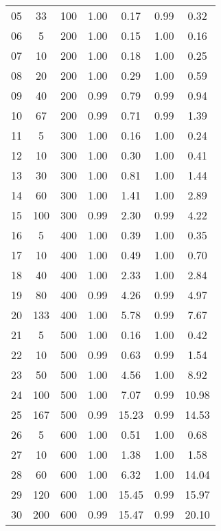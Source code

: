 \documentclass[11pt]{article}
\begin{document}
\begin{table}[]
\begin{tabular}{ccccccc}
			\rowcolor[HTML]{EFEFEF} 
			05 & 33 & 100 & 1.00 & 0.17 & 0.99 & 0.32 \\
			06 & 5 & 200 & 1.00 & 0.15 & 1.00 & 0.16 \\
			07 & 10 & 200 & 1.00 & 0.18 & 1.00 & 0.25 \\
			08 & 20 & 200 & 1.00 & 0.29 & 1.00 & 0.59 \\
			09 & 40 & 200 & 0.99 & 0.79 & 0.99 & 0.94 \\
			10 & 67 & 200 & 0.99 & 0.71 & 0.99 & 1.39 \\
			\rowcolor[HTML]{EFEFEF} 
			11 & 5 & 300 & 1.00 & 0.16 & 1.00 & 0.24 \\
			\rowcolor[HTML]{EFEFEF} 
			12 & 10 & 300 & 1.00 & 0.30 & 1.00 & 0.41 \\
			\rowcolor[HTML]{EFEFEF} 
			13 & 30 & 300 & 1.00 & 0.81 & 1.00 & 1.44 \\
			\rowcolor[HTML]{EFEFEF} 
			14 & 60 & 300 & 1.00 & 1.41 & 1.00 & 2.89 \\
			\rowcolor[HTML]{EFEFEF} 
			15 & 100 & 300 & 0.99 & 2.30 & 0.99 & 4.22 \\
			16 & 5 & 400 & 1.00 & 0.39 & 1.00 & 0.35 \\
			17 & 10 & 400 & 1.00 & 0.49 & 1.00 & 0.70 \\
			18 & 40 & 400 & 1.00 & 2.33 & 1.00 & 2.84 \\
			19 & 80 & 400 & 0.99 & 4.26 & 0.99 & 4.97 \\
			20 & 133 & 400 & 1.00 & 5.78 & 0.99 & 7.67 \\
			\rowcolor[HTML]{EFEFEF} 
			21 & 5 & 500 & 1.00 & 0.16 & 1.00 & 0.42 \\
			\rowcolor[HTML]{EFEFEF} 
			22 & 10 & 500 & 0.99 & 0.63 & 0.99 & 1.54 \\
			\rowcolor[HTML]{EFEFEF} 
			23 & 50 & 500 & 1.00 & 4.56 & 1.00 & 8.92 \\
			\rowcolor[HTML]{EFEFEF} 
			24 & 100 & 500 & 1.00 & 7.07 & 0.99 & 10.98 \\
			\rowcolor[HTML]{EFEFEF} 
			25 & 167 & 500 & 0.99 & 15.23 & 0.99 & 14.53 \\
			26 & 5 & 600 & 1.00 & 0.51 & 1.00 & 0.68 \\
			27 & 10 & 600 & 1.00 & 1.38 & 1.00 & 1.58 \\
			28 & 60 & 600 & 1.00 & 6.32 & 1.00 & 14.04 \\
			29 & 120 & 600 & 1.00 & 15.45 & 0.99 & 15.97 \\
			30 & 200 & 600 & 0.99 & 15.47 & 0.99 & 20.10 \\

\end{tabular}
\end{table}
\end{document}
